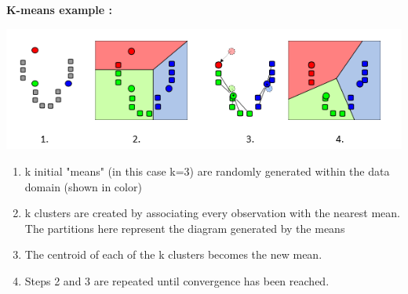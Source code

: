 \documentclass[10pt,a4paper]{article}
\begin{document}
{			\newpage
			\textbf{K-means example : }
		
			\includegraphics[scale=0.8]{kmeanseg.png}
	
			\begin{enumerate}
				\item	k initial "means" (in this case k=3) are randomly generated within the data domain (shown in color)
				\item	k clusters are created by associating every observation with the nearest mean. The partitions here represent the diagram generated by the means 
				\item	The centroid of each of the k clusters becomes the new mean.
				\item	Steps 2 and 3 are repeated until convergence has been reached.
				
			\end{enumerate}
			
}
\end{document}
